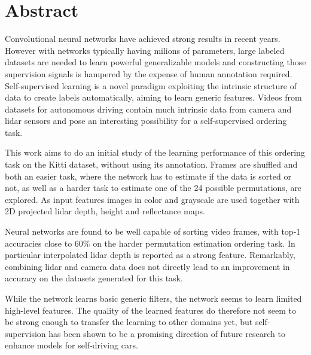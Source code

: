 %

\newpage
\vspace{3cm}

\chapter*{Abstract}
Convolutional neural networks have achieved strong results in recent years. However with networks typically having milions of parameters, large labeled datasets are needed to learn powerful generalizable models and constructing those supervision signals is hampered by the expense of human annotation required. Self-supervised learning is a novel paradigm exploiting the intrinsic structure of data to create labels automatically, aiming to learn generic features. Videos from datasets for autonomous driving contain much intrinsic data from camera and lidar sensors and pose an interesting possibility for a self-supervised ordering task. 

This work aims to do an initial study of the learning performance of this ordering task on the Kitti dataset, without using its annotation. Frames are shuffled and both an easier task, where the network has to estimate if the data is sorted or not, as well as a harder task to estimate one of the 24 possible permutations, are explored. As input features images in color and grayscale are used together with 2D projected lidar depth, height and reflectance maps.

Neural networks are found to be well capable of sorting video frames, with top-1 accuracies close to 60\% on the harder permutation estimation ordering task. In particular interpolated lidar depth is reported as a strong feature. Remarkably, combining lidar and camera data does not directly lead to an improvement in accuracy on the datasets generated for this task.

While the network learns basic generic filters, the network seems to learn limited high-level features. The quality of the learned features do therefore not seem to be strong enough to transfer the learning to other domains yet, but self-supervision has been shown to be a promising direction of future research to enhance models for self-driving cars.

